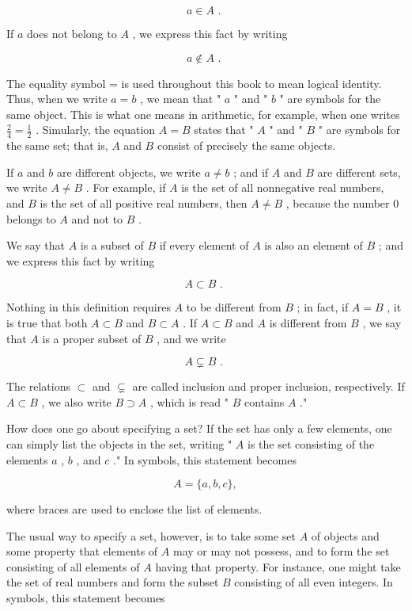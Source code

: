 \documentclass[10pt]{article}
\begin{document}
\[
a \in  A\text{ . }
\]

If \(a\) does not belong to \(A\) , we express this fact by writing

\[
a \notin  A\text{ . }
\]

The equality symbol = is used throughout this book to mean logical identity. Thus, when we write \(a = b\) , we mean that " \(a\) " and " \(b\) " are symbols for the same object. This is what one means in arithmetic, for example, when one writes \(\frac{2}{4} = \frac{1}{2}\) . Simularly, the equation \(A = B\) states that " \(A\) " and " \(B\) " are symbols for the same set; that is, \(A\) and \(B\) consist of precisely the same objects.

If \(a\) and \(b\) are different objects, we write \(a \neq  b\) ; and if \(A\) and \(B\) are different sets, we write \(A \neq  B\) . For example, if \(A\) is the set of all nonnegative real numbers, and \(B\) is the set of all positive real numbers, then \(A \neq  B\) , because the number 0 belongs to \(A\) and not to \(B\) .

We say that \(A\) is a subset of \(B\) if every element of \(A\) is also an element of \(B\) ; and we express this fact by writing

\[
A \subset  B\text{ . }
\]

Nothing in this definition requires \(A\) to be different from \(B\) ; in fact, if \(A = B\) , it is true that both \(A \subset  B\) and \(B \subset  A\) . If \(A \subset  B\) and \(A\) is different from \(B\) , we say that \(A\) is a proper subset of \(B\) , and we write

\[
A \subsetneq  B\text{ . }
\]

The relations \(\subset\) and \(\subsetneq\) are called inclusion and proper inclusion, respectively. If \(A \subset  B\) , we also write \(B \supset  A\) , which is read " \(B\) contains \(A\) ."

How does one go about specifying a set? If the set has only a few elements, one can simply list the objects in the set, writing " \(A\) is the set consisting of the elements \(a\) , \(b\) , and \(c\) ." In symbols, this statement becomes

\[
A = \{ a,b,c\} ,
\]

where braces are used to enclose the list of elements.

The usual way to specify a set, however, is to take some set \(A\) of objects and some property that elements of \(A\) may or may not possess, and to form the set consisting of all elements of \(A\) having that property. For instance, one might take the set of real numbers and form the subset \(B\) consisting of all even integers. In symbols, this statement becomes
\end{document}
